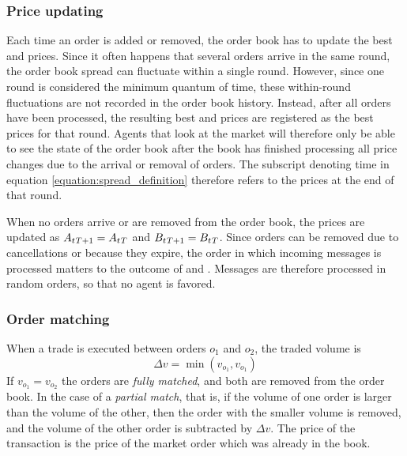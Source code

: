 \subsubsection{Price updating}
Each time an order is added or removed, the order book has to update the best \bid{} and \ask{} prices. Since it often happens that several orders arrive in the same round, the order book spread can fluctuate within a single round. However, since one round is considered the minimum quantum of time,  these within-round fluctuations are not recorded in the order book history. Instead, after all orders have been processed, the resulting best \bid{} and \ask{} prices are registered as the best prices for that round. Agents that look at the market will therefore only be able to see the state of the order book after the book has finished processing all price changes due to the arrival or removal of orders. The subscript denoting time in equation \ref{equation:spread_definition} therefore refers to the prices at the end of that round. 

When no orders arrive or are removed from the order book, the prices are updated as 
$A_{{t_{}{T} + 1}} = A_{t_{}{T}}$ and $B_{{t_{}{T} + 1}} = B_{t_{}{T}}$. Since orders can be removed due to cancellations or because they expire, the order in which incoming messages is processed matters to the outcome of  and . Messages are therefore processed in random orders, so that no agent is favored.



\subsubsection{Order matching}\label{section:order_matching}
When a trade is executed between orders $o_1$ and $o_2$, the traded volume is 
\begin{equation}
\Delta v = \min (v_{o_1}, v_{o_1}) \nonumber
\end{equation}
If $v_{o_1} = v_{o_2}$ the orders are \textit{fully matched}, and both are removed from the order book. In the case of a \textit{partial match}, that is, if the volume of one order is larger than the volume of the other, then the order with the smaller volume is removed, and the volume of the other order is subtracted by $\Delta v$. The price of the transaction is the price of the market order which was already in the book. 

